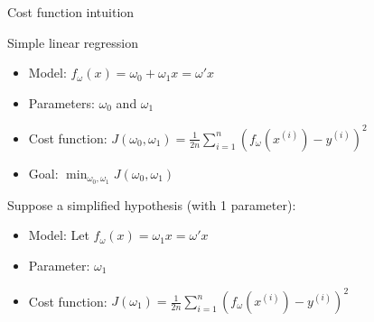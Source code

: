 \documentclass[
  9pt,
  ignorenonframetext,
  aspectratio=169,
  t, dvipsnames]{beamer}
\providecommand{\tightlist}{%
  \setlength{\itemsep}{0pt}\setlength{\parskip}{0pt}}\usepackage{longtable,booktabs,array}
\theoremstyle{definition}
\begin{document}
\begin{frame}{Cost function intuition}
\protect\hypertarget{cost-function-intuition}{}
\begin{block}{Simple linear regression}

\begin{itemize}
\tightlist
\item
  Model: \(f_{\omega}(x) = \omega_0 + \omega_1 x = \omega'x\)
\item
  Parameters: \(\omega_0\) and \(\omega_1\)
\item
  Cost function:
  \(J(\omega_0,\omega_1) = \frac{1}{2 n} \sum_{i=1}^{n}\left(f_{\omega}\left(x^{(i)}\right)-y^{(i)}\right)^{2}\)
\item
  Goal: \(\min_{\omega_0,\omega_1} J(\omega_0,\omega_1)\)
\end{itemize}

\end{block}

\vspace{1cm}

Suppose a \alert{simplified} hypothesis (with 1 parameter):

\begin{itemize}
\tightlist
\item
  Model: Let \(f_{\omega}(x) = \omega_1 x = \omega'x\)
\item
  Parameter: \(\omega_1\)
\item
  Cost function:
  \(J(\omega_1) = \frac{1}{2 n} \sum_{i=1}^{n}\left(f_{\omega}\left(x^{(i)}\right)-y^{(i)}\right)^{2}\)
\end{itemize}
\end{frame}
\end{document}
